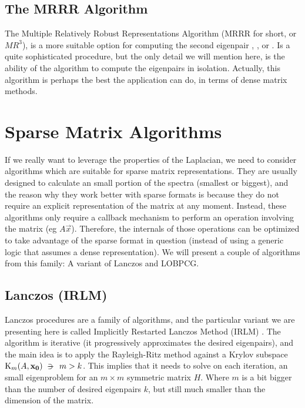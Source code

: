 \subsection{The \gls{MRRR} Algorithm}

The Multiple Relatively Robust Representations Algorithm (\gls{MRRR}
for short, or $MR^3$), is a more suitable option for computing the second
eigenpair \cite{dhillon97},
\cite{dhillon04}, \cite{dhillon06} or \cite{parlett04}. Is a quite
sophisticated procedure, but the only detail we will mention here, is
the ability of the algorithm to compute the eigenpairs in
isolation. Actually, this algorithm is perhaps the best 
the application can do, in terms of dense matrix methods.


\section{Sparse Matrix Algorithms}

If we really want to leverage the properties of the \gls{Laplacian}, we need
to consider algorithms which are suitable for sparse matrix
representations. They are usually designed to calculate an small
portion of the spectra (smallest or biggest), and the reason why they
work better with sparse formats is because they do not require
an explicit representation of the matrix at any moment. Instead, these
algorithms only require a callback mechanism to perform an operation
involving the matrix (eg $A\vec{x}$). Therefore, the internals of
those operations can be optimized to take advantage of the sparse
format in question (instead of using a generic logic that assumes a
dense representation). We will present a couple of algorithms from
this family: A variant of Lanczos and LOBPCG.

\subsection{Lanczos (\gls{IRLM})}
\label{sub:irlm}

Lanczos procedures are a family of algorithms, and the particular
variant we are presenting here is called Implicitly Restarted Lanczos
Method (\gls{IRLM}) \cite{arpack}. The algorithm is iterative (it
progressively approximates the 
desired eigenpairs), and the main idea is to apply the Rayleigh-Ritz
method against a Krylov subspace $\Krylov{A}{\vec{x_0}}{m} \suchthat m
> k$. This implies that it needs to solve on each iteration, an small
eigenproblem for an $m \times m$ symmetric matrix $H$. Where $m$ is a bit bigger
than the number of desired eigenpairs $k$, but still much smaller than the
dimension of the matrix. \\

